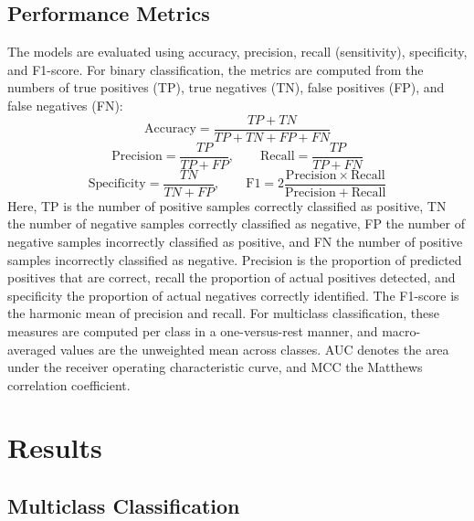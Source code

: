 \documentclass[runningheads]{llncs}
\begin{document}
\subsection{Performance Metrics}
The models are evaluated using accuracy, precision, recall (sensitivity), specificity, and F1-score. For binary classification, the metrics are computed from the numbers of true positives (TP), true negatives (TN), false positives (FP), and false negatives (FN):
\begin{equation}
    \mathrm{Accuracy}=\frac{TP+TN}{TP+TN+FP+FN}
    \label{eq:accuracy}
\end{equation}
\begin{equation}
    \mathrm{Precision}=\frac{TP}{TP+FP},\qquad
    \mathrm{Recall}=\frac{TP}{TP+FN}
    \label{eq:precision_recall}
\end{equation}
\begin{equation}
    \mathrm{Specificity}=\frac{TN}{TN+FP},\qquad
    \mathrm{F1}=2\frac{\mathrm{Precision}\times\mathrm{Recall}}
    {\mathrm{Precision}+\mathrm{Recall}}
    \label{eq:specificity_f1}
\end{equation}
Here, TP is the number of positive samples correctly classified as positive, TN the number of negative samples correctly classified as negative, FP the number of negative samples incorrectly classified as positive, and FN the number of positive samples incorrectly classified as negative. Precision is the proportion of predicted positives that are correct, recall the proportion of actual positives detected, and specificity the proportion of actual negatives correctly identified. The F1-score is the harmonic mean of precision and recall. For multiclass classification, these measures are computed per class in a one-versus-rest manner, and macro-averaged values are the unweighted mean across classes. AUC denotes the area under the receiver operating characteristic curve, and MCC the Matthews correlation coefficient.

\section{Results}
\label{sec:results}

\subsection{Multiclass Classification}
\end{document}
